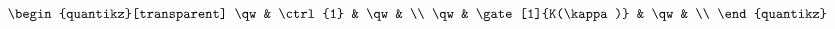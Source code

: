 \documentclass[10pt]{article}
\begin{document}
\[\begin{quantikz}[transparent]
    \qw &     \ctrl{1}     & \qw & \\
    \qw &     \gate[1]{K(\kappa)}   &  \qw & \\
\end{quantikz}

\]
\end{document}
